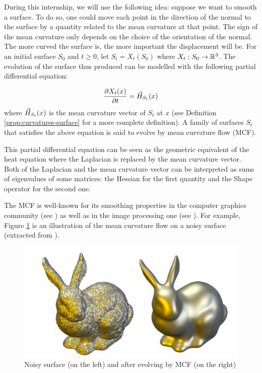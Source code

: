 During this internship, we will use the following idea: suppose we want to
smooth a surface. To do so, one could move each point in the direction of the
normal to the surface by a quantity related to the mean curvature at that point.
The sign of the mean curvature only depends on the choice of the orientation of
the normal.  The more curved the surface is, the more important the displacement
will be. For an initial surface $ S_0 $ and $ t \geq 0 $, let $ S_t = X_t(S_0) $
where $ X_t : S_0 \to \mathbb{R}^3 $. The evolution of the surface thus produced can be
modelled with the following partial differential equation:

$$ \frac{\partial{X_t(x)}}{\partial{t}} = \vec{H}_{S_t}(x) $$
where $ \vec{H}_{S_t}(x) $ is the mean curvature vector of $ S_t $ at $ x $
(see Definition \ref{prop:curvatures-surface} for a more complete definition).
A family of surfaces $ S_t $ that satisfies the above equation is said to evolve
by mean curvature flow (MCF).

This partial differential equation can be seen as the geometric equivalent of
the heat equation where the Laplacian is replaced by the mean curvature
vector. Both of the Laplacian and the mean curvature vector can be interpreted
as sums of eigenvalues of some matrices: the Hessian for the first quantity and
the Shape operator for the second one.

The MCF is well-known for its smoothing properties in the computer graphics
community (see \cite{desbrun1999implicit}) as well as in the image processing
one (see \cite{ciomaga2010level}). For example, Figure
\ref{fig:mean-curvature-flow-ex} is an illustration of the mean curvature flow
on a noisy surface (extracted from \cite{clarenz2000anisotropic}).

\begin{figure}[h]
    \centering
    \includegraphics[scale=0.3]{img/mean-curvature-flow-rabbit}
    \caption{Noisy surface (on the left) and after evolving by MCF (on the
        right)}
    \label{fig:mean-curvature-flow-ex}
\end{figure}

